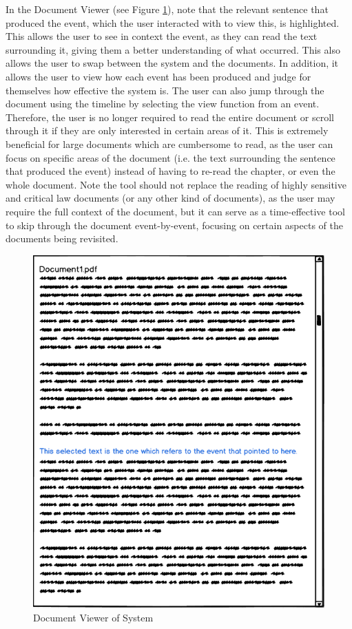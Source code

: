 \par In the Document Viewer (see Figure \ref{fig:viewDoc}), note that the relevant sentence that produced the event, which the user interacted with to view this, is highlighted. This allows the user to see in context the event, as they can read the text surrounding it, giving them a better understanding of what occurred. This also allows the user to swap between the system and the documents. In addition, it allows the user to view how each event has been produced and judge for themselves how effective the system is. The user can also jump through the document using the timeline by selecting the view function from an event. Therefore, the user is no longer required to read the entire document or scroll through it if they are only interested in certain areas of it. This is extremely beneficial for large documents which are cumbersome to read, as the user can focus on specific areas of the document (i.e. the text surrounding the sentence that produced the event) instead of having to re-read the chapter, or even the whole document. Note the tool should not replace the reading of highly sensitive and critical law documents (or any other kind of documents), as the user may require the full context of the document, but it can serve as a time-effective tool to skip through the document event-by-event, focusing on certain aspects of the documents being revisited.

\begin{figure}[H]
\caption{Document Viewer of System}
\label{fig:viewDoc}
\includegraphics[scale=0.75]{viewDoc.png}
\centering
\end{figure}









